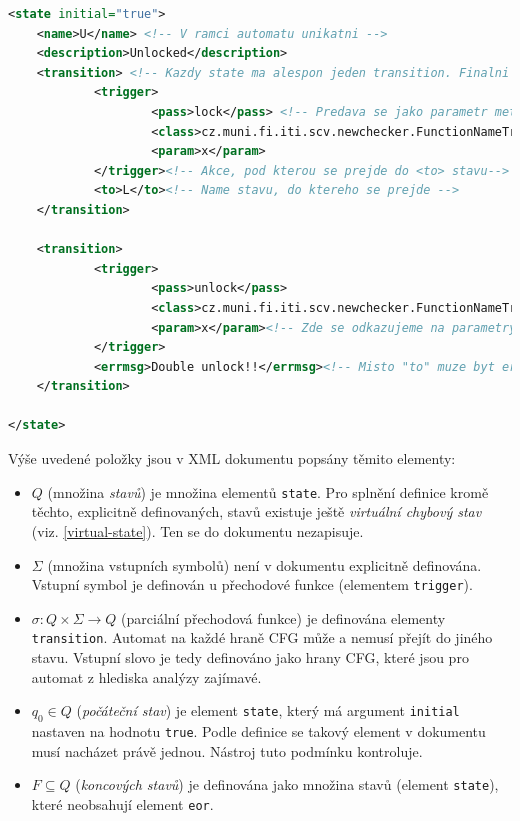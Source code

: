 \documentclass[11pt,final,oneside]{fithesis}
\begin{document}
\begin{lstlisting}[language=XML,caption=Zápis stavu konečného automatu]
<state initial="true">
    <name>U</name> <!-- V ramci automatu unikatni -->
    <description>Unlocked</description>
    <transition> <!-- Kazdy state ma alespon jeden transition. Finalni stavy totiz za stavy nepovazujeme (neevidujeme je) -->
            <trigger>
                    <pass>lock</pass> <!-- Predava se jako parametr metode loadTrigger  -->
                    <class>cz.muni.fi.iti.scv.newchecker.FunctionNameTrigger</class>
                    <param>x</param>
            </trigger><!-- Akce, pod kterou se prejde do <to> stavu-->
            <to>L</to><!-- Name stavu, do ktereho se prejde -->
    </transition>

    <transition>
            <trigger>
                    <pass>unlock</pass>
                    <class>cz.muni.fi.iti.scv.newchecker.FunctionNameTrigger</class>
                    <param>x</param><!-- Zde se odkazujeme na parametry. Na poradi zalezi. -->
            </trigger>
            <errmsg>Double unlock!!</errmsg><!-- Misto "to" muze byt errmsg. To znamena, ze se dostavame do chyboveho stavu. Automat konci -->
    </transition>

</state>
\end{lstlisting}

Výše uvedené položky jsou v XML dokumentu popsány těmito elementy:
\begin{itemize}
	\item $Q$ (množina \emph{stavů}) je množina elementů {\tt state}. Pro splnění definice kromě těchto, explicitně definovaných, stavů existuje ještě \emph{virtuální chybový stav} (viz. \ref{virtual-state}). Ten se do dokumentu nezapisuje.
	
	\item $\Sigma$ (množina vstupních symbolů) není v dokumentu explicitně definována. Vstupní symbol je definován u přechodové funkce (elementem {\tt trigger}).
	
	\item $\sigma: Q \times \Sigma \rightarrow Q$ (parciální přechodová funkce) je definována elementy {\tt transition}. Automat na každé hraně CFG může a nemusí přejít do jiného stavu. Vstupní slovo je tedy definováno jako hrany CFG, které jsou pro automat z hlediska analýzy zajímavé.
		
    \item $q_0 \in Q$ (\emph{počáteční stav}) je element {\tt state}, který má argument {\tt initial} nastaven na hodnotu {\tt true}. Podle definice se takový element v dokumentu musí nacházet právě jednou. Nástroj tuto podmínku kontroluje.
  
	\item $F \subseteq Q$ (\emph{koncových stavů}) je definována jako množina stavů (element {\tt state}), které neobsahují element {\tt eor}.
	 
\end{itemize}
\end{document}
